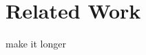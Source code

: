 \documentclass{sig-alternate-05-2015}
\begin{document}
%
%
%
%
%

\section{Related Work} \label{related-work}
{\color{red} make it longer}
\end{document}
